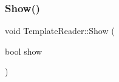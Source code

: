\hypertarget{class_template_reader_ae378fdaa6d77e57385f2d94d6baddb3d}{}\label{class_template_reader_ae378fdaa6d77e57385f2d94d6baddb3d} 
\subsubsection{\texorpdfstring{Show()}{Show()}}
{\footnotesize\ttfamily void Template\+Reader\+::\+Show (\begin{DoxyParamCaption}\item[{bool}]{show }\end{DoxyParamCaption})}

